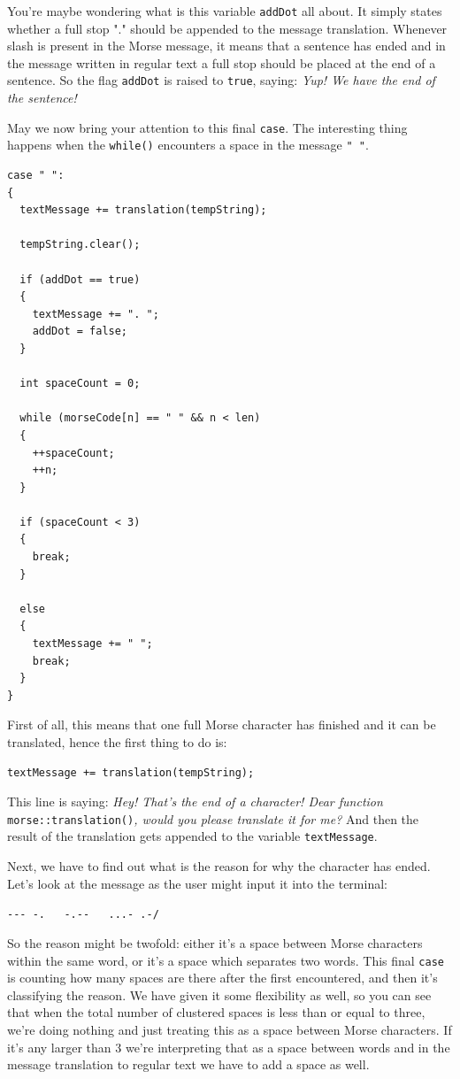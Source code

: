 \documentclass[10pt]{report}
\begin{document}
You're maybe wondering what is this variable \verb|addDot| all about. It simply states whether a full stop "." should be appended to the message translation. Whenever slash is present in the Morse message, it means that a sentence has ended and in the message written in regular text a full stop should be placed at the end of a sentence. So the flag \verb|addDot| is raised to \verb|true|, saying: \textit{Yup! We have the end of the sentence!} 

May we now bring your attention to this final \verb|case|. The interesting thing happens when the \verb|while()| encounters a space in the message \verb|" "|. 

\begin{lstlisting}
case " ":
{
  textMessage += translation(tempString);

  tempString.clear();

  if (addDot == true)
  {
    textMessage += ". ";
    addDot = false;
  }

  int spaceCount = 0;

  while (morseCode[n] == " " && n < len)
  {
    ++spaceCount;
    ++n;
  }

  if (spaceCount < 3)
  {
    break;
  }

  else
  {
    textMessage += " ";
    break;
  }
}
\end{lstlisting}

First of all, this means that one full Morse character has finished and it can be translated, hence the first thing to do is:

\begin{lstlisting}
textMessage += translation(tempString);
\end{lstlisting}

This line is saying: \textit{Hey! That's the end of a character! Dear function}
\texttt{morse::translation()}\textit{, would you please translate it for me?} And then the result of the translation gets appended to the variable \verb|textMessage|.

Next, we have to find out what is the reason for why the character has ended. Let's look at the message as the user might input it into the terminal:

\begin{snugshade}
\verb|--- -.   -.--   ...- .-/|
\end{snugshade}


So the reason might be twofold: either it's a space between Morse characters within the same word, or it's a space which separates two words. This final \verb|case| is counting how many spaces are there after the first encountered, and then it's classifying the reason. We have given it some flexibility as well, so you can see that when the total number of clustered spaces is less than or equal to three, we're doing nothing and just treating this as a space between Morse characters. If it's any larger than 3 we're interpreting that as a space between words and in the message translation to regular text we have to add a space as well.
\end{document}
